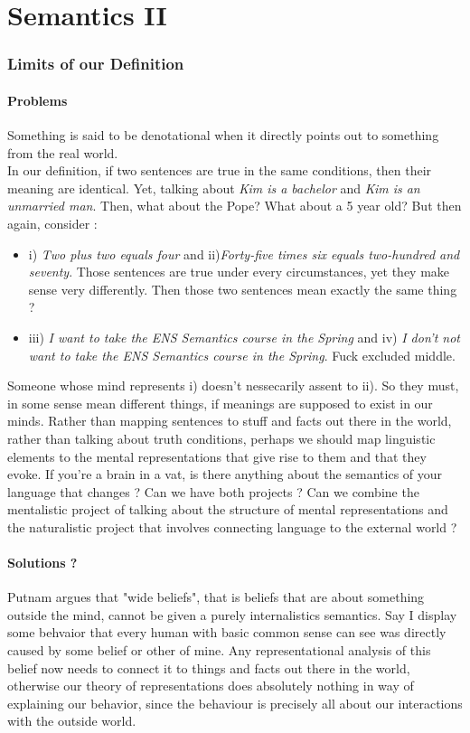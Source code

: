 \documentclass{cours}
\begin{document}
\part[Class 6 : 16/11]{Semantics II}
\section{Limits of our Definition}
\subsection{Problems}
Something is said to be denotational when it directly points out to something from the real world. \\

In our definition, if two sentences are true in the same conditions, then their meaning are identical.
Yet, talking about \textsl{Kim is a bachelor} and \textsl{Kim is an unmarried man}. Then, what about the Pope? What about a 5 year old?
But then again, consider : 
\begin{itemize}
    \item i) \textsl{Two plus two equals four} and ii)\textsl{Forty-five times six equals two-hundred and seventy}. Those sentences are true under every circumstances, yet they make sense very differently. Then those two sentences mean exactly the same thing ? 
    \item iii) \textsl{I want to take the ENS Semantics course in the Spring} and iv) \textsl{I don't not want to take the ENS Semantics course in the Spring}. Fuck excluded middle.
\end{itemize}
Someone whose mind represents i) doesn't nessecarily assent to ii). So they must, in some sense mean different things, if meanings are supposed to exist in our minds. Rather than mapping sentences to stuff and facts out there in the world, rather than talking about truth conditions, perhaps we should map linguistic elements to the mental representations that give rise to them and that they evoke. If you're a brain in a vat, is there anything about the semantics of your language that changes ? Can we have both projects ? Can we combine the mentalistic project of talking about the structure of mental representations and the naturalistic project that involves connecting language to the external world ? 

\subsection{Solutions ?}
Putnam argues that "wide beliefs", that is beliefs that are about something outside the mind, cannot be given a purely internalistics semantics. Say I display some behvaior that every human with basic common sense can see was directly caused by some belief or other of mine. Any representational analysis of this belief now needs to connect it to things and facts out there in the world, otherwise our theory of representations does absolutely nothing in way of explaining our behavior, since the behaviour is precisely all about our interactions with the outside world.\\
\end{document}
